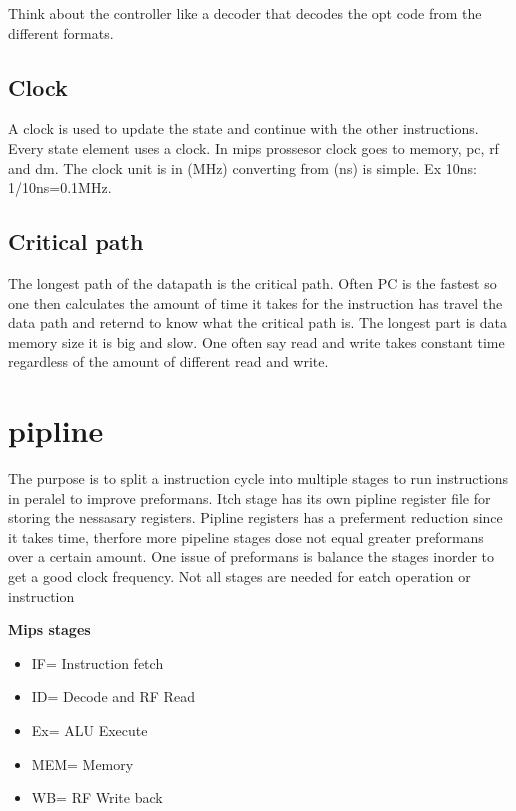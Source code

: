 Think about the controller like a decoder that decodes the opt code from the different formats.


\subsection{Clock}
A clock is used to update the state and continue with the other instructions. Every state element uses
a clock. In mips prossesor clock goes to memory, pc, rf and dm. The clock unit is in (MHz) converting
from (ns) is simple. Ex 10ns: 1/10ns=0.1MHz.

\subsection{Critical path}
The longest path of the datapath is the critical path. Often PC is the fastest so one then calculates the
amount of time it takes for the instruction has travel the data path and reternd to know what the
critical path is. The longest part is data memory size it is big and slow. One often say read and write
takes constant time regardless of the amount of different read and write.


\section{pipline}
The purpose is to split a instruction cycle into multiple stages to run instructions in peralel to
improve preformans. Itch stage has its own pipline register file for storing the nessasary registers.
Pipline registers has a preferment reduction since it takes time, therfore more pipeline stages dose
not equal greater preformans over a certain amount. One issue of preformans is balance the stages
inorder to get a good clock frequency. 
Not all stages are needed for eatch operation or instruction

\textbf{Mips stages}
\begin{itemize}
\item  IF= Instruction fetch
\item  ID= Decode and RF Read
\item  Ex= ALU Execute
\item  MEM= Memory
\item  WB= RF Write back
\end{itemize}

